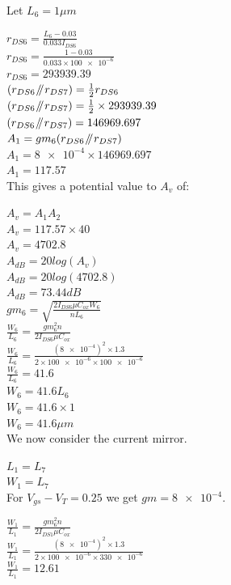 Let $L_{6} = 1\mu m$

$r_{DS6} = \frac{L_{6} - 0.03}{0.033I_{DS6}}$ \\
$r_{DS6} = \frac{1 - 0.03}{0.033 \times \num{100e-6}}$ \\
$r_{DS6} = 293939.39$ \\

$(r_{DS6} \mathbin{\!/\mkern-5mu/\!} r_{DS7}) = \frac{1}{2}r_{DS6}$ \\
$(r_{DS6} \mathbin{\!/\mkern-5mu/\!} r_{DS7}) = \frac{1}{2} \times 293939.39$ \\
$(r_{DS6} \mathbin{\!/\mkern-5mu/\!} r_{DS7}) = 146969.697$ \\

$A_{1} = gm_{6}(r_{DS6} \mathbin{\!/\mkern-5mu/\!} r_{DS7})$ \\
$A_{1} = \num{8e-4} \times 146969.697$ \\
$A_{1} = 117.57$ \\

This gives a potential value to $A_{v}$ of:

$A_{v} = A_{1}A_{2}$ \\
$A_{v} = 117.57 \times 40$ \\
$A_{v} = 4702.8$ \\

$A_{dB} = 20log(A_{v})$ \\
$A_{dB} = 20log(4702.8)$ \\
$A_{dB} = 73.44dB$ \\

$gm_{6} = \sqrt{\frac{2I_{DS6}\mu C_{ox}W_{6}}{nL_{6}}}$ \\
$\frac{W_{6}}{L_{6}} = \frac{gm_{6}^{2}n}{2I_{DS6}\mu C_{ox}}$ \\
$\frac{W_{6}}{L_{6}} = \frac{(\num{8e-4})^{2} \times 1.3}{2 \times \num{100e-6} \times \num{100e-6}}$ \\
$\frac{W_{6}}{L_{6}} = 41.6$ \\

$W_{6} = 41.6L_{6}$ \\
$W_{6} = 41.6 \times 1$ \\
$W_{6} = 41.6\mu m$ \\

We now consider the current mirror.

$L_{1} = L_{7}$ \\
$W_{1} = L_{7}$ \\

For $V_{gs} - V_{T} = 0.25$ we get $gm = \num{8e-4}$.

$\frac{W_{1}}{L_{1}} = \frac{gm_{6}^{2}n}{2I_{DS1}\mu C_{ox}}$ \\
$\frac{W_{1}}{L_{1}} = \frac{(\num{8e-4})^{2} \times 1.3}{2 \times \num{100e-6} \times \num{330e-6}}$ \\
$\frac{W_{1}}{L_{1}} = 12.61$ \\

